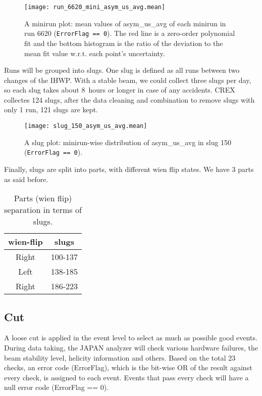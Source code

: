 \begin{figure}[!h]
    \centering
    \texttt{[image: run\_6620\_mini\_asym\_us\_avg.mean]}
    \caption{A minirun plot: mean values of asym\_us\_avg of each minirun in 
    run 6620 (\texttt{ErrorFlag == 0}).
    The red line is a zero-order polynomial fit and the bottom histogram is
    the ratio of the deviation to the mean fit value w.r.t. each point's uncertainty.
    }
\end{figure}

Runs will be grouped into slugs. One slug is defined as all runs between two
changes of the IHWP. With a stable beam, we could collect three slugs per day, so 
each slug takes about 8~hours or longer in case of any accidents. CREX collectes
124 slugs, after the data cleaning and combination to remove slugs with only 1 run, 
121 slugs are kept.
\begin{figure}[!h]
    \centering
    \texttt{[image: slug\_150\_asym\_us\_avg.mean]}
    \caption{A slug plot: minirun-wise distribution of asym\_us\_avg in slug 150 
    (\texttt{ErrorFlag == 0}).}
\end{figure}

Finally, slugs are split into parts, with different wien flip states. 
We have 3 parts as said before.
\begin{table}[!h]
    \centering
    \begin{tabular}{c | c}
	\hline
	wien-flip   & slugs \\
	\hline
	Right	& 100-137   \\
	Left	& 138-185   \\
	Right	& 186-223   \\
	\hline
    \end{tabular}
    \caption{Parts (wien flip) separation in terms of slugs.}
\end{table}

\subsection{Cut}
A loose cut is applied in the event level to select as much as possible good events.
During data taking, the JAPAN analyzer will check various hardware failures, the
beam stability level, helicity information and others. Based on the total 23 checks,
an error code (ErrorFlag), which is the bit-wise OR of the result against every
check, is assigned to each event. Events that pass every check will have
a null error code (ErrorFlag == 0). 

